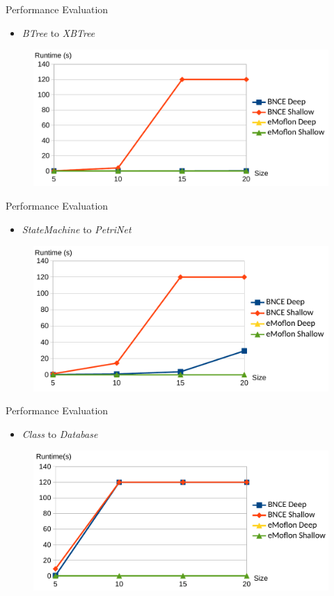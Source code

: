 \documentclass[usenames,dvipsnames]{beamer}
\begin{document}
	\begin{frame}{Performance Evaluation}
		\begin{itemize}
			\item \emph{BTree} to \emph{XBTree}
		\end{itemize}
		\begin{figure}
			\centering
			\includegraphics[width=\textwidth]{figures/performance/btree2xbtree}
		\end{figure}
	\end{frame}
	
	\begin{frame}{Performance Evaluation}
		\begin{itemize}
			\item \emph{StateMachine} to \emph{PetriNet}
		\end{itemize}
		\begin{figure}
			\centering
			\includegraphics[width=\textwidth]{figures/performance/statemachine2petrinet}
		\end{figure}
	\end{frame}
	
	\begin{frame}{Performance Evaluation}
		\begin{itemize}
			\item \emph{Class} to \emph{Database}
		\end{itemize}
		\begin{figure}
			\centering
			\includegraphics[width=\textwidth]{figures/performance/class2database}
		\end{figure}
	\end{frame}
\end{document}
